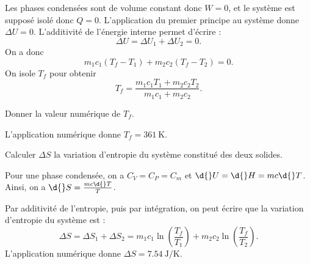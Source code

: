 
\begin{corrige}
Les phases condensées sont de volume constant donc $W=0$, et le système est supposé isolé donc $Q=0$. L'application du premier principe au système donne $\Delta U=0$.
L'additivité de l'énergie interne permet d'écrire : 
\[
\Delta U=\Delta U_1+\Delta U_2=0.
\]
On a donc 
\[
m_1c_1\left(T_f-T_1\right)+m_2c_2\left(T_f-T_2\right)=0.
\]
 On isole $T_f$ pour obtenir
\[
T_f=\frac{m_1c_1T_1+m_2c_2T_2}{m_1c_1+m_2c_2}.
\]
\end{corrige}




\begin{enonce}
Donner la valeur numérique de $T_f$. \minusMedskip

\end{enonce}


\begin{corrige}
L'application numérique donne $T_f=\SI{361}{\kelvin}$.
\end{corrige}





\begin{enonce}
Calculer $\Delta S$ la variation d’entropie du système constitué des deux solides. 

\end{enonce}


\begin{corrige}
Pour une phase condensée, on a $C_V=C_P=C_m$ et $\d{}U=\d{}H=mc\d{}T$. Ainsi, on a $\d{}S=\frac{mc\d{}T}{T}$.

Par additivité de l'entropie, puis par intégration, on peut écrire que la variation d'entropie du système est : 
\[
\Delta S=\Delta S_1+\Delta S_2=m_1c_1\ln\left(\frac{T_f}{T_1}\right)+m_2c_2\ln\left(\frac{T_f}{T_2}\right).
\]
L'application numérique donne $\Delta S=\SI{7,54}{\joule\per\kelvin}$.
\end{corrige}

